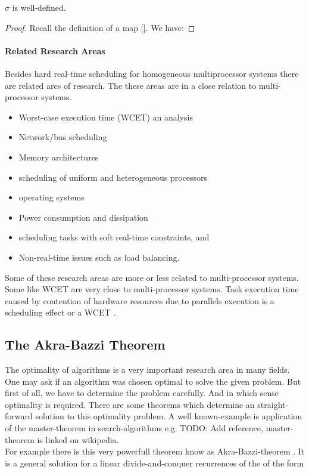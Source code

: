 	
	\begin{lemma}
	 $\sigma$ is well-defined.
	\end{lemma}
	\begin{proof}
	Recall the definition of a map \ref{}. We have:
	\end{proof}
	
	\paragraph{Related Research Areas}
	\label{par:RelatedResearchAreas}
	
		Besides hard real-time scheduling for homogeneous multiprocessor systems there are related ares of research. The these areas are in a  close relation to multi-processor systems.
		\begin{itemize}
		\item Worst-case execution time (WCET) an analysis
		\item Network/bus scheduling
		\item Memory architectures
		\item scheduling of uniform and heterogeneous processors
		\item operating systems
		\item Power consumption and dissipation
		\item scheduling tasks with soft real-time constraints, and
		\item Non-real-time issues such as load balancing.
		\end{itemize}
		Some of these research areas are more or less related to multi-processor systems. Some like WCET are very close to multi-processor systems.
		Task execution time caused by contention of hardware resources due to parallels execution is a scheduling effect or a WCET \cite[Sec. 10.2]{DB2011}.
		
 
\subsection{The Akra-Bazzi Theorem}
\label{subsection:The Akra-Bazzi Theorem}

	The optimality of algorithms is a very important research area in many fields.
	One may ask if an algorithm was chosen optimal to solve the given problem.
	But first of all, we have to determine the problem carefully. And in which sense optimality is required. There are some theorems which determine an straight-forward solution to this optimality problem. A well known-example is application of the master-theorem in search-algorithms e.g. \cite {}TODO: Add reference, master-theorem is linked on wikipedia.\\
	For example there is this very powerfull theorem know as Akra-Bazzi-theorem \cite{AB98}.
	It is a general solution for a linear divide-and-conquer recurrences of the of the form

